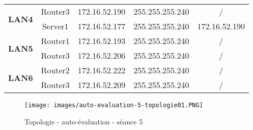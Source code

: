 \documentclass[a4paper]{article}
\begin{document}
\begin{itemize}
\begin{center}
\begin{tabular}{|c|c|c|c|c|}
        \multirow{2}{*}{\textbf{LAN4}}
        & Router3 & 172.16.52.190 & 255.255.255.240 & / \\
        & Server1 & 172.16.52.177 & 255.255.255.240 & 172.16.52.190 \\ \hline

        \multirow{2}{*}{\textbf{LAN5}}
        & Router1 & 172.16.52.193 & 255.255.255.240 & / \\
        & Router3 & 172.16.52.206 & 255.255.255.240 & / \\ \hline

        \multirow{2}{*}{\textbf{LAN6}}
        & Router2 & 172.16.52.222 & 255.255.255.240 & / \\
        & Router3 & 172.16.52.209 & 255.255.255.240 & / \\ \hline
    \end{tabular}
\end{center}





\end{itemize}





\begin{figure}[H]
    \centering
    \texttt{[image: images/auto-evaluation-5-topologie01.PNG]}
    \caption{Topologie - auto-évaluation - séance 5}
    \label{fig:topologieAutoEvaluationSeance5}
\end{figure}
\end{document}
